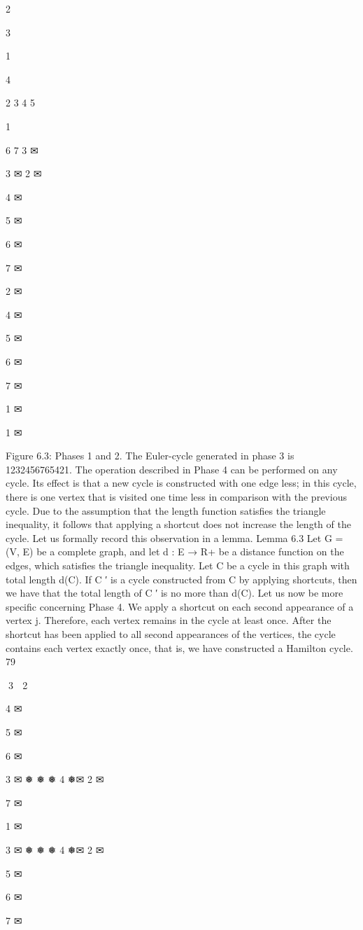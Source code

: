 2

3

1

4

2
3
4
5

1

6
7
3 ✉

3 ✉
2 ✉

4
✉

5
✉

6
✉

7
✉

2 ✉

4
✉

5
✉

6
✉

7
✉

1 ✉

1 ✉

Figure 6.3: Phases 1 and 2.
The Euler-cycle generated in phase 3 is 1232456765421.
The operation described in Phase 4 can be performed on any cycle. Its effect is that a new cycle is
constructed with one edge less; in this cycle, there is one vertex that is visited one time less in comparison
with the previous cycle. Due to the assumption that the length function satisfies the triangle inequality,
it follows that applying a shortcut does not increase the length of the cycle. Let us formally record this
observation in a lemma.
Lemma 6.3 Let G = (V, E) be a complete graph, and let d : E → R+ be a distance function on the
edges, which satisfies the triangle inequality. Let C be a cycle in this graph with total length d(C). If C ′
is a cycle constructed from C by applying shortcuts, then we have that the total length of C ′ is no more
than d(C).
Let us now be more specific concerning Phase 4. We apply a shortcut on each second appearance of a
vertex j. Therefore, each vertex remains in the cycle at least once. After the shortcut has been applied
to all second appearances of the vertices, the cycle contains each vertex exactly once, that is, we have
constructed a Hamilton cycle.
79

3 ✉
2 ✉

4
✉

5
✉

6
✉

3 ✉
❅
❅
❅ 4
❅✉
2 ✉

7
✉

1 ✉

3 ✉
❅
❅
❅ 4
❅✉
2 ✉

5
✉

6
✉

7
✉

